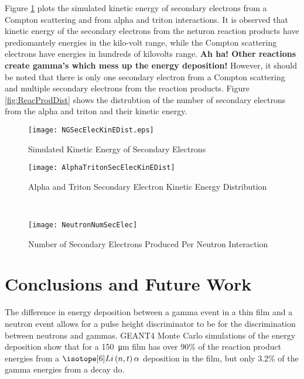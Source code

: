 \documentclass[draftcls,onecolumn]{IEEEtran}
\begin{document}
Figure \ref{fig:simKinE} plots the simulated kinetic energy of secondary electrons from a Compton scattering and from alpha and triton interactions.
It is observed that kinetic energy of the secondary electrons from the neturon reaction products have prediomantely energies in the kilo-volt range, while the Compton scattering electrons have energies in hundreds of kilovolts range. 
\textbf{Ah ha! Other reactions create gamma's which mess up the energy deposition!}
However, it should be noted that there is only one secondary electron from a Compton scattering and multiple secondary electrons from the reaction products.
Figure \ref{fig:ReacProdDist} shows the distrubtion of the number of secondary electrons from the alpha and triton and their kinetic energy.
\begin{figure}[ht]
    \centering
    \texttt{[image: NGSecElecKinEDist.eps]}
    \caption{Simulated Kinetic Energy of Secondary Electrons }
    \label{fig:simKinE}
\end{figure}
\begin{figure*}[ht]
	\centering
	\begin{subfigure}[b]{0.45\textwidth}
    		\texttt{[image: AlphaTritonSecElecKinEDist]}
		\caption{Alpha and Triton Secondary Electron Kinetic Energy Distribution}
	\end{subfigure}%
	~
	\begin{subfigure}[b]{0.45\textwidth}
    		\texttt{[image: NeutronNumSecElec]}
		\caption{Number of Secondary Electrons Produced Per Neutron Interaction}
	\end{subfigure}%
	\caption{Neutron Reaction Products Secondary Electrons Energies}
	\label{fig:ReacProdDist}
\end{figure*}
\section{Conclusions and Future Work}
\label{sec:Conclusions}

The difference in energy deposition between a gamma event in a thin film and a neutron event allows for a pulse height discriminator to be for the discrimination between neutrons and gammas.
GEANT4 Monte Carlo simulations of the energy deposition show that for a \SI{150}{\um} film has over 90\% of the reaction product energies from a $\iso[6]{Li}\left(n,t\right)\alpha$ deposition in the film, but only 3.2\% of the gamma energies from a  decay do.
\end{document}
